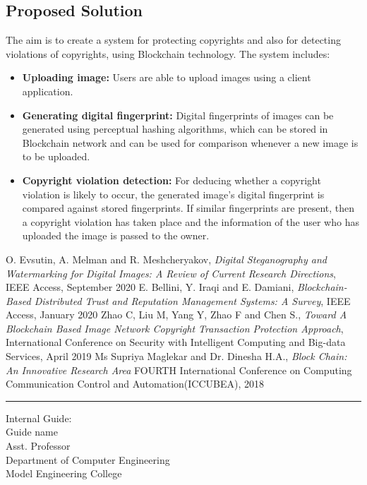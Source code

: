 \documentclass[10pt]{article}
\begin{document}
\subsection{Proposed Solution}
The aim is to create a system for protecting copyrights and also for detecting violations of copyrights, using Blockchain technology. The system includes: 
\begin{itemize}
   \item \textbf{Uploading image:} Users are able to upload images using a client application.
   \item \textbf{Generating digital fingerprint:} Digital fingerprints of images can be generated using perceptual hashing algorithms, which can be stored in Blockchain network and can be used for comparison whenever a new image is to be uploaded. 
   \item \textbf{Copyright violation detection:} For deducing whether a copyright violation is likely to occur, the generated image’s digital fingerprint is compared against stored fingerprints. If similar fingerprints are present, then a copyright violation has taken place and the information of the user who has uploaded the image is passed to the owner.
\end{itemize}
\begin{thebibliography}{9}
\bibitem{} O. Evsutin, A. Melman and R. Meshcheryakov, \emph{Digital Steganography and Watermarking for \quad Digital Images: A Review of Current Research Directions}, IEEE Access, September 2020
\bibitem{} E. Bellini, Y. Iraqi and E. Damiani, \emph{Blockchain-Based Distributed Trust and Reputation Management Systems: A Survey}, IEEE Access, January 2020
\bibitem{} Zhao C, Liu M, Yang Y, Zhao F and Chen S., \emph{Toward A Blockchain Based Image Network Copyright Transaction Protection Approach}, International Conference on Security with Intelligent Computing and Big-data Services, April 2019
\bibitem{} Ms Supriya Maglekar and Dr. Dinesha H.A., \emph{Block Chain: An Innovative Research Area} FOURTH International Conference on Computing Communication Control and Automation(ICCUBEA), 2018

\end{thebibliography}

\hrule
\vspace{.2in}
\begin{flushleft}
Internal Guide:
\vspace{.3in}
\\Guide name
\\Asst. Professor
\\Department of Computer Engineering 
\\Model Engineering College 
\end{flushleft}
\end{document}
